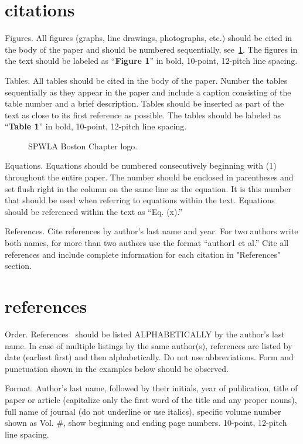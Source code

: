 \documentclass[10pt,twocolumn,twoside]{article}
\begin{document}
\section{citations}

Figures. All figures (graphs, line drawings, photographs, etc.) should be cited in the body of the paper and should be numbered sequentially, see~\cref{fig:logo}. The figures in the text should be labeled as “\textbf{Figure 1}” in bold, 10-point, 12-pitch line spacing.

Tables. All tables should be cited in the body of the paper. Number the tables sequentially as they appear in the paper and include a caption consisting of the table number and a brief description. Tables should be inserted as part of the text as close to its first reference as possible. The tables should be labeled as “\textbf{Table 1}” in bold, 10-point, 12-pitch line spacing.

\begin{figure}
	\centering
	\caption{SPWLA Boston Chapter logo.}
	\label{fig:logo}
\end{figure}


Equations. Equations should be numbered consecutively beginning with (1) throughout the entire paper. The number should be enclosed in parentheses and set flush right in the column on the same line as the equation. It is this number that should be used when referring to equations within the text. Equations should be referenced within the text as “Eq. (x).”

References. Cite references by author’s last name and year. For two authors write both names, for more than two authors use the format “author1 et al.” Cite all references and include complete information for each citation in "References" section.

\section{references}

Order. References~\citep{Archie1942} should be listed ALPHABETICALLY by the author’s last name. In case of multiple listings by the same author(s), references are listed by date (earliest first) and then alphabetically. Do not use abbreviations. Form and punctuation shown in the examples below should be observed.

Format. Author's last name, followed by their initials, year of publication, title of paper or article (capitalize only the first word of the title and any proper nouns), full name of journal (do not underline or use italics), specific volume number shown as Vol. \#, show beginning and ending page numbers. 10-point, 12-pitch line spacing.
\end{document}
